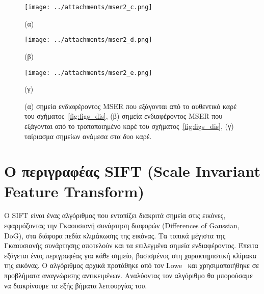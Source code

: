  
\newpage
 

\begin{figure}[!ht]
\begin{minipage}[b]{0.5\linewidth}
\centering
\texttt{[image: ../attachments/mser2\_c.png]}
\caption*{(α)}
\label{fig:mser_4}
\end{minipage}
\hspace{0.9cm}
\begin{minipage}[b]{0.5\linewidth}
\centering
\texttt{[image: ../attachments/mser2\_d.png]}
\caption*{(β)}
\label{fig:mser_5}
\end{minipage}

\end{figure} 

 
% 
\begin{figure}[!h]
\begin{minipage}[b]{1.0\linewidth}
\centering
\texttt{[image: ../attachments/mser2\_e.png]}
\caption*{(γ)}
\label{fig:mser_6}
\end{minipage}
\caption{(α) σημεία ενδιαφέροντος MSER που εξάγονται από το αυθεντικό καρέ του σχήματος~\ref{fig:figs_dis},
(β) σημεία ενδιαφέροντος MSER που εξάγονται από το τροποποιημένο καρέ του σχήματος~\ref{fig:figs_dis}, (γ) ταίριασμα σημείων ανάμεσα στα δυο καρέ.}
\label{fig:mser_dis_figs}
\end{figure} 
 

\newpage %

\section{Ο περιγραφέας SIFT (Scale Invariant Feature Transform)}

Ο SIFT είναι ένας αλγόριθμος που εντοπίζει διακριτά σημεία στις εικόνες,
εφαρμόζοντας την Γκαουσιανή συνάρτηση διαφορών (Differences of Gaussian, DoG),
στα διάφορα πεδία κλιμάκωσης της εικόνας. Τα τοπικά μέγιστα της Γκαουσιανής συνάρτησης 
αποτελούν και τα επιλεγμένα σημεία ενδιαφέροντος. Έπειτα εξάγεται ένας περιγραφέας για
κάθε σημείο, βασισμένος στη χαρακτηριστική κλίμακα της εικόνας.
Ο αλγόριθμος αρχικά προτάθηκε από τον Lowe~\cite{lowe2004distinctive} και χρησιμοποιήθηκε σε προβλήματα αναγνώρισης αντικειμένων.
Αναλύοντας τον αλγόριθμο θα μπορούσαμε να διακρίνουμε τα εξής βήματα λειτουργίας του.

